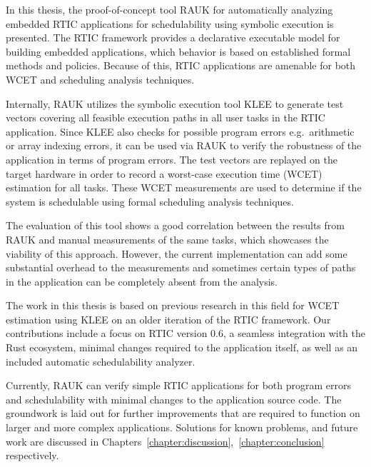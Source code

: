 In this thesis, the proof-of-concept tool RAUK for automatically analyzing
embedded RTIC applications for schedulability using symbolic execution is presented.
The RTIC framework provides a declarative executable model for building
embedded applications, which behavior is based on established formal methods
and policies. Because of this, RTIC applications are amenable for both WCET and
scheduling analysis techniques.

Internally, RAUK utilizes the symbolic execution tool KLEE to generate test vectors
covering all feasible execution paths in all user tasks in the RTIC
application. Since KLEE also checks for possible program errors e.g.\ arithmetic or
array indexing errors, it can be used via RAUK to verify the robustness of the
application in terms of program errors. The test vectors are replayed on the
target hardware in order to record a worst-case execution time (WCET) estimation for all
tasks. These WCET measurements are used to determine if the system is
schedulable using formal scheduling analysis techniques.

The evaluation of this tool shows a good correlation between the results from
RAUK and manual measurements of the same tasks, which showcases the viability
of this approach. However, the current implementation can add some substantial
overhead to the measurements and sometimes certain types of paths in the
application can be completely absent from the analysis.

The work in this thesis is based on previous research in this field for WCET
estimation using KLEE on an older iteration of the RTIC framework. Our
contributions include a focus on RTIC version 0.6, a seamless
integration with the Rust ecosystem, minimal changes required to the
application itself, as well as an included automatic schedulability analyzer.

Currently, RAUK can verify simple RTIC applications for both program errors and
schedulability with minimal changes to the application source code. The
groundwork is laid out for further improvements that are required to function
on larger and more complex applications. Solutions for known problems, and future work
are discussed in Chapters~\ref{chapter:discussion},~\ref{chapter:conclusion} respectively.
